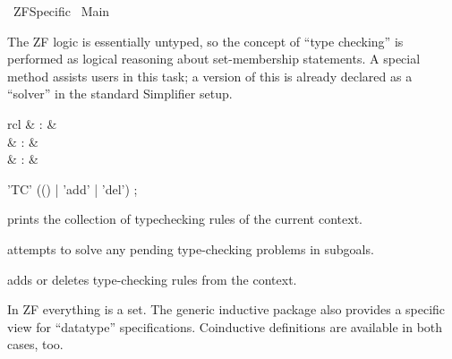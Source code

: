 %
\begin{isabellebody}%
\def\isabellecontext{ZF{\isacharunderscore}Specific}%
%
\isadelimtheory
\isanewline
\isanewline
%
\endisadelimtheory
%
\isatagtheory
{}\isamarkupfalse%
\ ZF{\isacharunderscore}Specific\isanewline
{}\ Main\isanewline
{}%
\endisatagtheory
{\isafoldtheory}%
%
\isadelimtheory
%
\endisadelimtheory
%
\isamarkuptrue%
%
\isamarkuptrue%
%
\begin{isamarkuptext}%
The ZF logic is essentially untyped, so the concept of ``type
  checking'' is performed as logical reasoning about set-membership
  statements.  A special method assists users in this task; a version
  of this is already declared as a ``solver'' in the standard
  Simplifier setup.

  \begin{matharray}{rcl}
    \mbox{}\isa{{\isachardoublequote}\isactrlsup {\isacharasterisk}{\isachardoublequote}} & : &  \\
    \mbox{} & : & \isarmeth \\
    \mbox{} & : & \isaratt \\
  \end{matharray}

  \begin{rail}
    'TC' (() | 'add' | 'del')
    ;
  \end{rail}

  \begin{descr}
  
  \item [\mbox{\isa{\isacommand{print{\isacharunderscore}tcset}}}] prints the collection of
  typechecking rules of the current context.
  
  \item [\mbox{\isa{typecheck}}] attempts to solve any pending
  type-checking problems in subgoals.
  
  \item [\mbox{\isa{TC}}] adds or deletes type-checking rules
  from the context.

  \end{descr}%
\end{isamarkuptext}%
\isamarkuptrue%
%
\isamarkuptrue%
%
\isamarkuptrue%
%
\begin{isamarkuptext}%
In ZF everything is a set.  The generic inductive package also
  provides a specific view for ``datatype'' specifications.
  Coinductive definitions are available in both cases, too.


\end{isamarkuptext}
\end{isabellebody}
